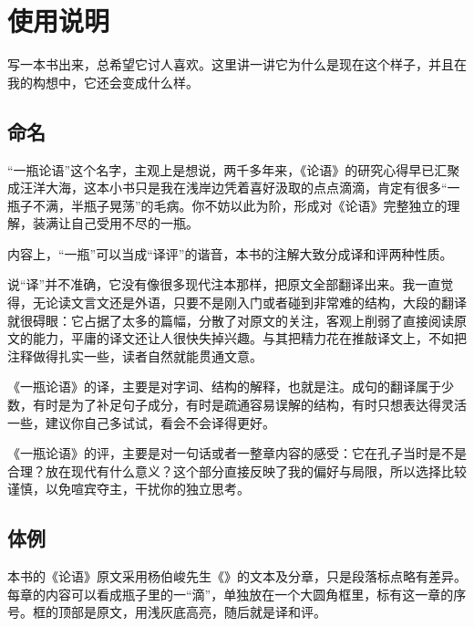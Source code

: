 \chapter*{使\quad 用\quad 说\quad 明}

写一本书出来，总希望它讨人喜欢。这里讲一讲它为什么是现在这个样子，并且在我的构想中，它还会变成什么样。


\lypdfbookmark\section*{命名}

“一瓶论语”这个名字，主观上是想说，两千多年来，《论语》的研究心得早已汇聚成汪洋大海，这本小书只是我在浅岸边凭着喜好汲取的点点滴滴，肯定有很多“一瓶子不满，半瓶子晃荡”的毛病。你不妨以此为阶，形成对《论语》完整独立的理解，装满让自己受用不尽的一瓶。

内容上，“一瓶”可以当成“译评”的谐音，本书的注解大致分成译和评两种性质。

说“译”并不准确，它没有像很多现代注本那样，把原文全部翻译出来。我一直觉得，无论读文言文还是外语，只要不是刚入门或者碰到非常难的结构，大段的翻译就很碍眼：它占据了太多的篇幅，分散了对原文的关注，客观上削弱了直接阅读原文的能力，平庸的译文还让人很快失掉兴趣。与其把精力花在推敲译文上，不如把注释做得扎实一些，读者自然就能贯通文意。

《一瓶论语》的译，主要是对字词、结构的解释，也就是注。成句的翻译属于少数，有时是为了补足句子成分，有时是疏通容易误解的结构，有时只想表达得灵活一些，建议你自己多试试，看会不会译得更好。

《一瓶论语》的评，主要是对一句话或者一整章内容的感受：它在孔子当时是不是合理？放在现代有什么意义？这个部分直接反映了我的偏好与局限，所以选择比较谨慎，以免喧宾夺主，干扰你的独立思考。


\lypdfbookmark\section*{体例}

本书的《论语》原文采用杨伯峻先生《》的文本及分章，只是段落标点略有差异。每章的内容可以看成瓶子里的一“滴”，单独放在一个大圆角框里，标有这一章的序号。框的顶部是原文，用\colorbox{lytextbackground}{浅灰底}高亮，随后就是译和评。

